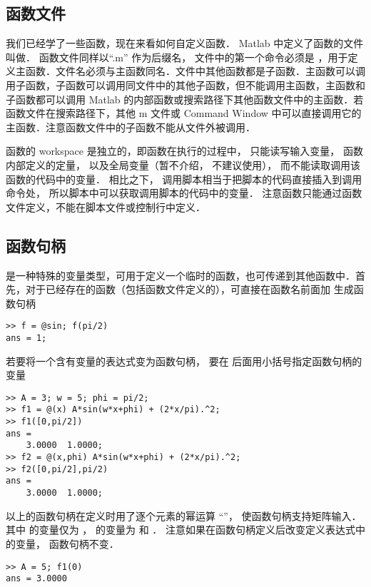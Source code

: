 

\subsection{函数文件}

我们已经学了一些函数，现在来看如何自定义函数． Matlab 中定义了函数的文件叫做． 函数文件同样以“.m” 作为后缀名， 文件中的第一个命令必须是 ，用于定义主函数．文件名必须与主函数同名．文件中其他函数都是子函数．主函数可以调用子函数，子函数可以调用同文件中的其他子函数，但不能调用主函数，主函数和子函数都可以调用 Matlab 的内部函数或搜索路径下其他函数文件中的主函数．若函数文件在搜索路径下，其他 m 文件或 Command Window 中可以直接调用它的主函数．注意函数文件中的子函数不能从文件外被调用．

函数的 workspace 是独立的，即函数在执行的过程中， 只能读写输入变量， 函数内部定义的定量， 以及全局变量（暂不介绍， 不建议使用）， 而不能读取调用该函数的代码中的变量． 相比之下， 调用脚本相当于把脚本的代码直接插入到调用命令处， 所以脚本中可以获取调用脚本的代码中的变量． 注意函数只能通过函数文件定义，不能在脚本文件或控制行中定义．

\subsection{函数句柄}
 是一种特殊的变量类型，可用于定义一个临时的函数，也可传递到其他函数中．首先，对于已经存在的函数（包括函数文件定义的），可直接在函数名前面加  生成函数句柄
\begin{lstlisting}[language=plain]
>> f = @sin; f(pi/2)
ans = 1;
\end{lstlisting}
若要将一个含有变量的表达式变为函数句柄， 要在  后面用小括号指定函数句柄的变量
\begin{lstlisting}[language=plain]
>> A = 3; w = 5; phi = pi/2;
>> f1 = @(x) A*sin(w*x+phi) + (2*x/pi).^2;
>> f1([0,pi/2])
ans =
    3.0000  1.0000;
>> f2 = @(x,phi) A*sin(w*x+phi) + (2*x/pi).^2;
>> f2([0,pi/2],pi/2)
ans =
    3.0000  1.0000;
\end{lstlisting}
以上的函数句柄在定义时用了逐个元素的幂运算 “”， 使函数句柄支持矩阵输入． 其中  的变量仅为 ，  的变量为  和 ． 注意如果在函数句柄定义后改变定义表达式中的变量， 函数句柄不变．
\begin{lstlisting}[language=plain]
>> A = 5; f1(0)
ans = 3.0000
\end{lstlisting}

